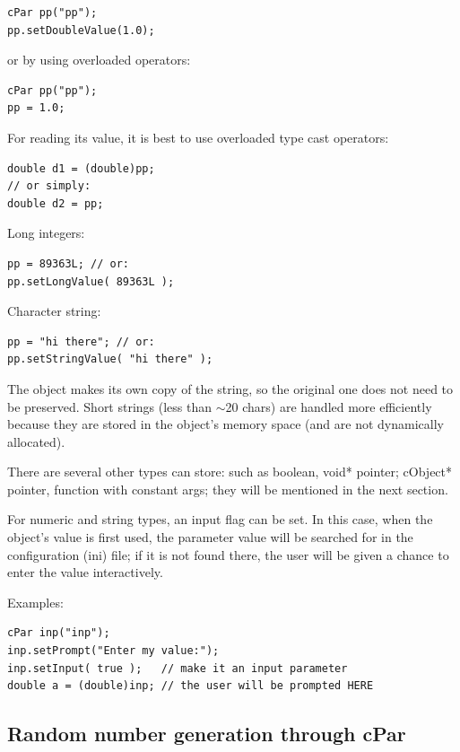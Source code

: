 \begin{verbatim}
cPar pp("pp");
pp.setDoubleValue(1.0);
\end{verbatim}


or by using overloaded operators:

\begin{verbatim}
cPar pp("pp");
pp = 1.0;
\end{verbatim}


For reading its value, it is best to use overloaded type cast
operators:

\begin{verbatim}
double d1 = (double)pp;
// or simply:
double d2 = pp;
\end{verbatim}

Long integers:

\begin{verbatim}
pp = 89363L; // or:
pp.setLongValue( 89363L );
\end{verbatim}

Character string:

\begin{verbatim}
pp = "hi there"; // or:
pp.setStringValue( "hi there" );
\end{verbatim}


The  object makes its own copy of the string, so the
original one does not need to be preserved. Short strings (less than
\ensuremath{\sim}20 chars) are handled more efficiently because they
are stored in the object's memory space (and are not dynamically
allocated).

There are several other types  can store: such as boolean,
void* pointer; cObject* pointer,  function with constant args;
they will be mentioned in the next section.

For numeric and string types, an input flag can be
set. In this case, when the object's value is first used, the
parameter value will be searched for in the configuration (ini)
file; if it is not found there, the user will be given
a chance to enter the value interactively.


Examples:

\begin{verbatim}
cPar inp("inp");
inp.setPrompt("Enter my value:");
inp.setInput( true );   // make it an input parameter
double a = (double)inp; // the user will be prompted HERE
\end{verbatim}




\subsection{Random number generation through cPar}

